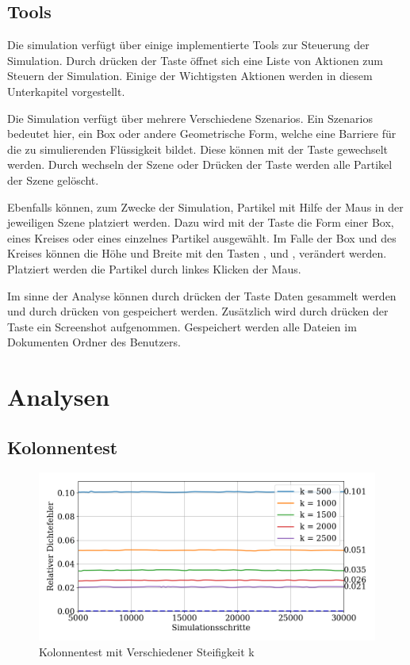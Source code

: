 \documentclass[a4paper, 12pt]{article}
\begin{document}
\subsection{Tools}
Die simulation verfügt über einige implementierte Tools zur Steuerung der Simulation. Durch drücken der Taste  öffnet sich eine Liste von Aktionen zum Steuern der Simulation. Einige der Wichtigsten Aktionen werden in diesem Unterkapitel vorgestellt. 

Die Simulation verfügt über mehrere Verschiedene \glqq Szenarios\grqq{}. Ein \glqq Szenarios\grqq{} bedeutet hier, ein Box oder andere Geometrische Form, welche eine Barriere für die zu simulierenden Flüssigkeit bildet. Diese können mit der Taste  gewechselt werden. Durch wechseln der Szene oder Drücken der Taste  werden alle Partikel der Szene gelöscht. 

Ebenfalls können, zum Zwecke der Simulation, Partikel mit Hilfe der Maus in der jeweiligen Szene platziert werden. Dazu wird mit der Taste  die Form einer Box, eines Kreises oder eines einzelnes Partikel
ausgewählt. Im Falle der Box und des Kreises können die Höhe und Breite mit den Tasten ,  und ,  verändert werden. Platziert werden die Partikel durch linkes Klicken der Maus.

Im sinne der Analyse können durch drücken der Taste  Daten gesammelt werden und durch drücken von  gespeichert werden. Zusätzlich wird durch drücken der Taste  ein Screenshot aufgenommen. Gespeichert werden alle Dateien im Dokumenten Ordner des Benutzers.

\section{Analysen} \label{section_6}
\subsection{Kolonnentest}
\begin{figure}[H]
	\centering
	\includegraphics[width=\textwidth]{graphics/Steifigkeit.png}
	\caption{Kolonnentest mit Verschiedener Steifigkeit k}
\end{figure}
\end{document}
